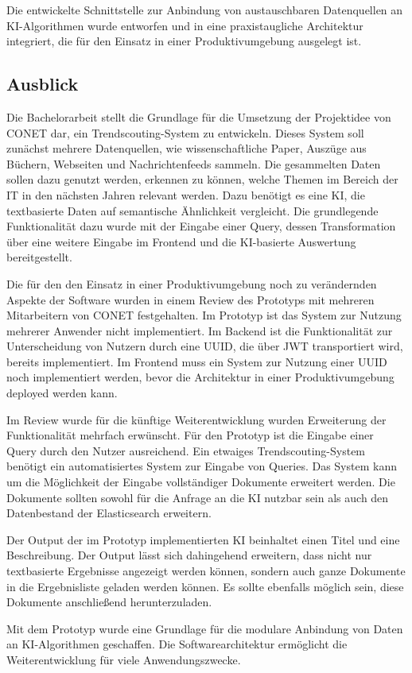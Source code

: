 Die entwickelte Schnittstelle zur Anbindung von austauschbaren Datenquellen an KI-Algorithmen wurde entworfen und in eine praxistaugliche Architektur integriert, die für den Einsatz in einer Produktivumgebung ausgelegt ist. 

\subsection{Ausblick}
Die Bachelorarbeit stellt die Grundlage für die Umsetzung der Projektidee von CONET dar, ein Trendscouting-System zu entwickeln. Dieses System soll zunächst mehrere Datenquellen, wie wissenschaftliche Paper, Auszüge aus Büchern, Webseiten und Nachrichtenfeeds sammeln. Die gesammelten Daten sollen dazu genutzt werden, erkennen zu können, welche Themen im Bereich der IT in den nächsten Jahren relevant werden. Dazu benötigt es eine KI, die textbasierte Daten auf semantische Ähnlichkeit vergleicht. Die grundlegende Funktionalität dazu wurde mit der Eingabe einer Query, dessen Transformation über eine weitere Eingabe im Frontend und die KI-basierte Auswertung bereitgestellt.

Die für den den Einsatz in einer Produktivumgebung noch zu verändernden Aspekte der Software wurden in einem Review des Prototyps mit mehreren Mitarbeitern von CONET festgehalten. Im Prototyp ist das System zur Nutzung mehrerer Anwender nicht implementiert. Im Backend ist die Funktionalität zur Unterscheidung von Nutzern durch eine UUID, die über JWT transportiert wird, bereits implementiert. Im Frontend muss ein System zur Nutzung einer UUID noch implementiert werden, bevor die Architektur in einer Produktivumgebung deployed werden kann.  

Im Review wurde für die künftige Weiterentwicklung wurden Erweiterung der Funktionalität mehrfach erwünscht. Für den Prototyp ist die Eingabe einer Query durch den Nutzer ausreichend. Ein etwaiges Trendscouting-System benötigt ein automatisiertes System zur Eingabe von Queries. Das System kann um die Möglichkeit der Eingabe vollständiger Dokumente erweitert werden. Die Dokumente sollten sowohl für die Anfrage an die KI nutzbar sein als auch den Datenbestand der Elasticsearch erweitern. 

Der Output der im Prototyp implementierten KI beinhaltet einen Titel und eine Beschreibung. Der Output lässt sich dahingehend erweitern, dass nicht nur textbasierte Ergebnisse angezeigt werden können, sondern auch ganze Dokumente in die Ergebnisliste geladen werden können. Es sollte ebenfalls möglich sein, diese Dokumente anschließend herunterzuladen.

Mit dem Prototyp wurde eine Grundlage für die modulare Anbindung von Daten an KI-Algorithmen geschaffen. Die Softwarearchitektur ermöglicht die Weiterentwicklung für viele Anwendungszwecke. 
